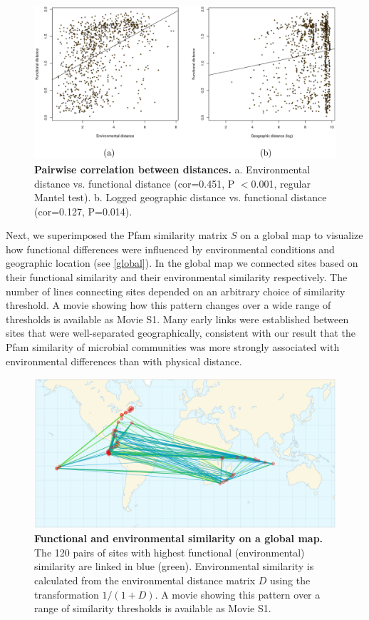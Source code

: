 \begin{figure}
\centering
\includegraphics[width=\textwidth]{NMF/figures/fig4}
\caption{\textbf{Pairwise correlation between distances. } a. Environmental distance vs. functional distance (cor=0.451, P $<$0.001, regular Mantel test).  b. Logged geographic distance vs. functional distance (cor=0.127, P=0.014).}
\label{NMF_fig4}
\end{figure}

Next, we superimposed the Pfam similarity matrix $S$ on a global map to visualize how functional differences were influenced by environmental conditions and geographic location (see \ref{global}).  In the global map we connected sites based on their functional similarity and their environmental similarity respectively.  The number of lines connecting sites depended on an arbitrary choice of similarity threshold.  A movie showing how this pattern changes over a wide range of thresholds is available as Movie S1.  Many early links were established between sites that were well-separated geographically, consistent with our result that the Pfam similarity of microbial communities was more strongly associated with environmental differences than with physical distance.  

\begin{figure}
\label{global}
\centering
\includegraphics[width=\textwidth]{NMF/figures/fig5}
\caption[]{\textbf{Functional and environmental similarity on a global map. } The 120 pairs of sites with highest functional (environmental) similarity are linked in blue (green).  Environmental similarity is calculated from the environmental distance matrix $D$ using the transformation $1/(1+D)$. A movie showing this pattern over a range of similarity thresholds is available as Movie S1.}
\label{NMF_fig5}
\end{figure}

